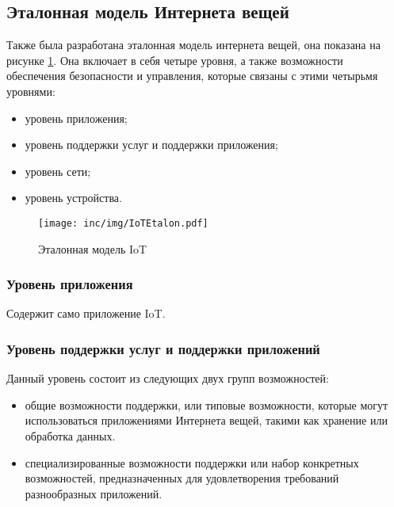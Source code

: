 \subsection{Эталонная модель Интернета вещей}

Также была разработана эталонная модель интернета вещей, она показана на рисунке \ref{fig:iotetalon}.
Она включает в себя четыре уровня, а также возможности обеспечения безопасности и управления, которые связаны с этими четырьмя уровнями:

\begin{itemize}
	\item уровень приложения;
	\item уровень поддержки услуг и поддержки приложения;
	\item уровень сети;
	\item уровень устройства.
\end{itemize}

\begin{figure}
  \centering
  \texttt{[image: inc/img/IoTEtalon.pdf]}
	\caption{Эталонная модель IoT\cite{itutiot2012}}
  \label{fig:iotetalon}
\end{figure}


\subsubsection{Уровень приложения}

Содержит само приложение IoT.


\subsubsection{Уровень поддержки услуг и поддержки приложений}

Данный уровень состоит из следующих двух групп возможностей:

\begin{itemize}
	\item общие возможности поддержки, или типовые возможности, которые могут использоваться приложениями Интернета вещей, такими как хранение или обработка данных.
	\item специализированные возможности поддержки или набор конкретных возможностей, предназначенных для удовлетворения требований разнообразных приложений.
\end{itemize}


